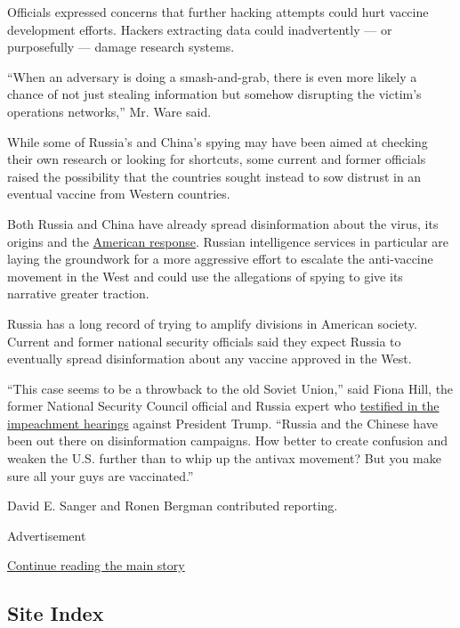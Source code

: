 Officials expressed concerns that further hacking attempts could hurt
vaccine development efforts. Hackers extracting data could inadvertently
--- or purposefully --- damage research systems.

``When an adversary is doing a smash-and-grab, there is even more likely
a chance of not just stealing information but somehow disrupting the
victim's operations networks,'' Mr. Ware said.

While some of Russia's and China's spying may have been aimed at
checking their own research or looking for shortcuts, some current and
former officials raised the possibility that the countries sought
instead to sow distrust in an eventual vaccine from Western countries.

Both Russia and China have already spread disinformation about the
virus, its origins and the
\href{https://www.nytimes3xbfgragh.onion/2020/04/22/us/politics/coronavirus-china-disinformation.html}{American
response}. Russian intelligence services in particular are laying the
groundwork for a more aggressive effort to escalate the anti-vaccine
movement in the West and could use the allegations of spying to give its
narrative greater traction.

Russia has a long record of trying to amplify divisions in American
society. Current and former national security officials said they expect
Russia to eventually spread disinformation about any vaccine approved in
the West.

``This case seems to be a throwback to the old Soviet Union,'' said
Fiona Hill, the former National Security Council official and Russia
expert who
\href{https://www.nytimes3xbfgragh.onion/2019/11/21/us/politics/fiona-hill-impeachment-ukraine.html}{testified
in the impeachment hearings} against President Trump. ``Russia and the
Chinese have been out there on disinformation campaigns. How better to
create confusion and weaken the U.S. further than to whip up the antivax
movement? But you make sure all your guys are vaccinated.''

David E. Sanger and Ronen Bergman contributed reporting.

Advertisement

\protect\hyperlink{after-bottom}{Continue reading the main story}

\hypertarget{site-index}{%
\subsection{Site Index}\label{site-index}}

